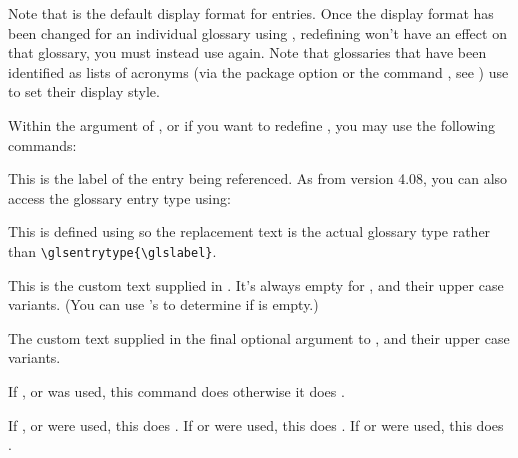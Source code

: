 \documentclass[report,inlinetitle]{nlctdoc}
\begin{document}
\begin{important}
Note that  is the default display format for
entries. Once the display format has been changed for an individual
glossary using , redefining 
won't have an effect on that glossary, you must instead use
 again. Note that glossaries that have
been identified as lists of acronyms (via the package option
 or the command , 
see ) use 
 to set their display style.
\end{important}

Within the  argument of , or if you
want to redefine , you may use the following
commands:

\begin{definition}[\DescribeMacro{\glslabel}]
\end{definition}
This is the label of the entry being referenced. As from version
4.08, you can also access the glossary entry type using:
\begin{definition}[\DescribeMacro{\glstype}]
\end{definition}
This is defined using  so the replacement text is the
actual glossary type rather than \verb|\glsentrytype{\glslabel}|.

\begin{definition}[\DescribeMacro{\glscustomtext}]
\end{definition}
This is the custom text supplied in . It's always empty
for ,  and their upper case variants. (You can 
use 's  to determine if
 is empty.) 

\begin{definition}[\DescribeMacro{\glsinsert}]
\end{definition}
The custom text supplied in the final optional argument to ,
 and their upper case variants.

\begin{definition}[\DescribeMacro{\glsifplural}]
\end{definition}
If ,  or  was used, this command does 
 otherwise it does .

\begin{definition}[\DescribeMacro{\glscapscase}]
\end{definition}
If ,  or  were used, this does . If  or  were used, this does . If  or  were used, this does .
\end{document}
